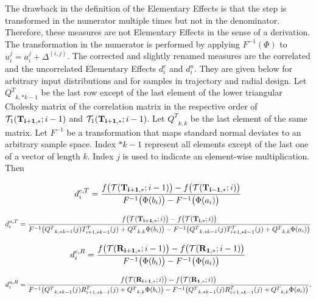 \documentclass[a4paper,12pt]{article}
\begin{document}
The drawback in the definition of the Elementary Effects is that the step is transformed in the numerator multiple times but not in the denominator. Therefore, these measures are not Elementary Effects in the sense of a derivation. The transformation in the numerator is performed by applying $F^{-1}(\Phi)$ to $u_i^j = a_i^j + \Delta^{(i,j)}$. The corrected and slightly renamed measures are the correlated and the uncorrelated Elementary Effects $d_i^{c}$ and $d_i^{u}$. They are given below for arbitrary input distributions and for samples in trajectory and radial design. Let ${Q^T}_{k,*k-1}$ be the last row except of the last element of the lower triangular Cholesky matrix of the correlation matrix in the respective order of $\mathcal{T}_1(\bold{T_{i+1,*}}; i-1)$ and $\mathcal{T}_1(\bold{T_{i+1,*}}; i-1)$. Let ${Q^T}_{k,k}$ be the last element of the same matrix. Let $F^{-1}$ be a transformation that maps standard normal deviates to an arbitrary sample space. Index $*k-1$ represent all elements except of the last one of a vector of length $k$. Index $j$ is used to indicate an element-wise multiplication. Then

\begin{align}
d_i^{c,T} = \frac{f\big(\mathcal{T}(\bold{T_{i+1,*}}; i-1)\big) - f\big(\mathcal{T}(\bold{T_{i-1,*}}; i)\big)}{F^{-1}\big(\Phi(b_i)\big) - F^{-1}\big( \Phi(a_i)\big)}
\end{align}

\begin{align}
d_i^{u, T} = \frac{f\big(\mathcal{T}(\bold{T_{i+1,*}}; i)\big) - f\big(\mathcal{T}(\bold{T_{i,*}}; i)\big)}{F^{-1}\big({Q^T}_{k,*k-1}(j)T_{i+1,*k-1}^T(j) + {Q^T}_{k,k} \Phi(b_i)\big) - F^{-1}\big({Q^T}_{k,*k-1}(j)T_{i+1,*k-1}^T(j)+{Q^T}_{k,k} \Phi(a_i)\big)}
\end{align}

\begin{align}
d_i^{c, R} = \frac{f\big(\mathcal{T}(\bold{R_{i+1,*}}; i-1)\big) - f\big(\mathcal{T}(\bold{R_{1,*}}; i-1)\big)}{F^{-1}\big( \Phi(b_i)\big) - F^{-1}\big( \Phi(a_i)\big)}
\end{align}

\begin{align}
d_i^{u, R} = \frac{f\big(\mathcal{T}(\bold{R_{i+1,*}}; i)\big) - f\big(\mathcal{T}(\bold{R_{1,*}}; i)\big)}{F^{-1}\big({Q^T}_{k,*k-1}(j)R_{i+1,*k-1}^T(j) + {Q^T}_{k,k} \Phi(b_i)\big) - F^{-1}\big({Q^T}_{k,*k-1}(j)R_{i+1,*k-1}^T(j)+{Q^T}_{k,k} \Phi(a_i)\big)}.
\end{align}
\end{document}
